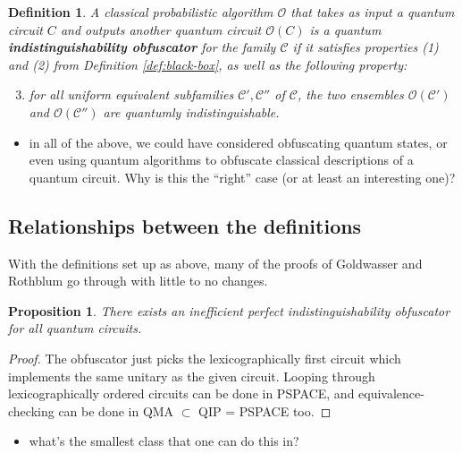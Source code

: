 \documentclass[11pt]{article}
\numberwithin{equation}{section}
\newtheorem{proposition}{Proposition}
\newtheorem{definition}{Definition}
\begin{document}
{\begin{definition} A classical probabilistic algorithm $\mathcal O$ that takes as input a quantum circuit $C$ and outputs another quantum circuit $\mathcal O(C)$ is a quantum {\bf indistinguishability obfuscator} for the family $\mathcal C$ if it satisfies properties (1) and (2) from Definition \ref{def:black-box}, as well as the following property:
\begin{enumerate}
\setcounter{enumi}{2}
\item for all uniform equivalent subfamilies $\mathcal C', \mathcal C''$ of $\mathcal C$, the two ensembles $\mathcal O(\mathcal C')$ and $\mathcal O(\mathcal C'')$ are quantumly indistinguishable.
\end{enumerate}
\end{definition}

\begin{itemize}
\item in all of the above, we could have considered obfuscating quantum states, or even using quantum algorithms to obfuscate classical descriptions of a quantum circuit. Why is this the ``right'' case (or at least an interesting one)?
\end{itemize}

\subsection{Relationships between the definitions}

With the definitions set up as above, many of the proofs of Goldwasser and Rothblum go through with little to no changes.

\begin{proposition} There exists an inefficient perfect indistinguishability obfuscator for all quantum circuits.
\end{proposition}
\begin{proof}
The obfuscator just picks the lexicographically first circuit which implements the same unitary as the given circuit. Looping through lexicographically ordered circuits can be done in PSPACE, and equivalence-checking can be done in QMA $\subset$ QIP = PSPACE too.
\end{proof}

\begin{itemize}
\item what's the smallest class that one can do this in?
\end{itemize}

}
\end{document}
